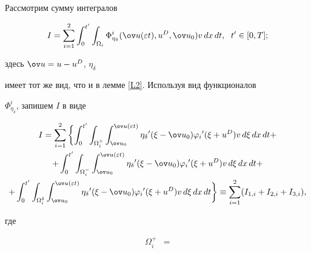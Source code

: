 \begin{pf}


Рассмотрим сумму интегралов 


$$ %


I=\sum_{i=1}^{2} \int_{0}^{{t}'} 


\int_{\Omega_{i}} \Phi_{\eta_{\delta}}^{i}


(\ov u(\varepsilon t), u^{D}, \ov u_{0}) v\, dx\, dt, 


\ \; {t}' \in [0,T];


$$


здесь $\ov u=u-u^{D}$, $\eta_{\delta}$ 


имеет тот же вид, что и в лемме \ref{L2}. Используя вид функционалов 


$\Phi_{\eta_{\delta}}^{i}$, запишем $I$ в виде


\begin{multline}


\label{eq19} 


I=\sum_{i=1}^{2} \bigg\{{ \int_{0}^{{t}'} \int_{\Omega_{i}^{+}}


\int_{\ov u_{0}}^{\ov u(\varepsilon t)} 


{\eta_{\delta}}' (\xi-\ov u_{0}){\varphi_{i}}'


(\xi+u^{D}) v\, d\xi\, dx\, dt+} \\


%


+\int_{0}^{{t}'} \int_{\Omega_{i}^{-}}


\int_{\ov u_{0}}^{\ov u(\varepsilon t)} 


{\eta_{\delta}}' (\xi-\ov u_{0}){\varphi_{i}}'


(\xi+u^{D}) v\, d\xi\, dx\, dt+ \\


%


{+\int_{0}^{{t}'} \int_{\Omega_{i}^{\delta}}


\int_{\ov u_{0}}^{\ov u(\varepsilon t)} 


{\eta_{\delta}}' (\xi-\ov u_{0}){\varphi_{i}}'


(\xi+u^{D}) v\, d \xi\, dx\, dt} \bigg\}


\equiv \sum_{i=1}^{2} (I_{1,i}+I_{2,i}+I_{3,i}),


\end{multline}


где 


\begin{align*}


\Omega_{i}^{+}&=



\end{align*}
\end{pf}

